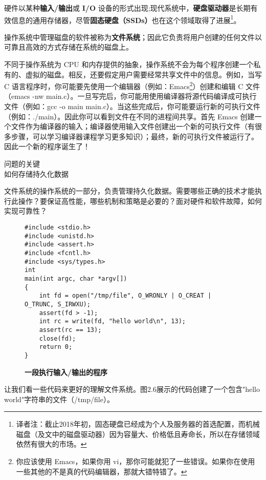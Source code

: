 硬件以某种\textbf{输入/输出}或 \textbf{I/O} 设备的形式出现;现代系统中，\textbf{硬盘驱动器}是长期有效信息的通用存储器，尽管\textbf{固态硬盘（SSDs）}也在这个领域取得了进展\footnote{译者注：截止2018年初，固态硬盘已经成为个人及服务器的首选配置，而机械磁盘（及文中的磁盘驱动器）因为容量大、价格低且寿命长，所以在存储领域依然有很大的市场。}。

操作系统中管理磁盘的软件被称为\textbf{文件系统}；因此它负责将用户创建的任何文件以可靠且高效的方式存储在系统的磁盘上。

不同于操作系统为 CPU 和内存提供的抽象，操作系统不会为每个程序创建一个私有的、虚拟的磁盘。相反，还要假定用户需要经常共享文件中的信息。例如，当写 C 语言程序时，你可能要先使用一个编辑器（例如：Emacs\footnote{你应该使用 Emacs，如果你用 vi，那你可能就犯了一些错误。如果你在使用一些其他的不是真的代码编辑器，那就大错特错了。}）创建和编辑 C 文件（emacs -nw main.c）。一旦写完后，你可能用使用编译器将源代码编译成可执行文件（例如：gcc -o main main.c）。当这些完成后，你可能要运行新的可执行文件（例如：./main）。因此你可以看到文件在不同的进程间共享。首先 Emacs 创建一个文件作为编译器的输入；编译器使用输入文件创建出一个新的可执行文件（有很多步骤，可以学习编译器课程学习更多知识）；最终，新的可执行文件被运行了。因此一个新的程序诞生了！

\begin{tcolorbox}[colframe=grey,colback= grey,arc=0pt,left=6pt,right=6pt,top=6pt,bottom=6pt,boxsep=0pt]
\begin{center}
问题的关键\\
如何存储持久化数据
\end{center}
文件系统的操作系统的一部分，负责管理持久化数据。需要哪些正确的技术才能执行此操作？要保证高性能，哪些机制和策略是必要的？面对硬件和软件故障，如何实现可靠性？
\end{tcolorbox}

\begin{figure}[ht]
\begin{lstlisting}
#include <stdio.h>
#include <unistd.h>
#include <assert.h>
#include <fcntl.h>
#include <sys/types.h>
int
main(int argc, char *argv[])
{
    int fd = open("/tmp/file", O_WRONLY | O_CREAT | O_TRUNC, S_IRWXU);
    assert(fd > -1);
    int rc = write(fd, "hello world\n", 13);
    assert(rc == 13);
    close(fd);
    return 0;
}
\end{lstlisting}
\caption{\textbf{一段执行输入/输出的程序}}
\end{figure}

让我们看一些代码来更好的理解文件系统。图2.6展示的代码创建了一个包含"hello world"字符串的文件（/tmp/file）。

